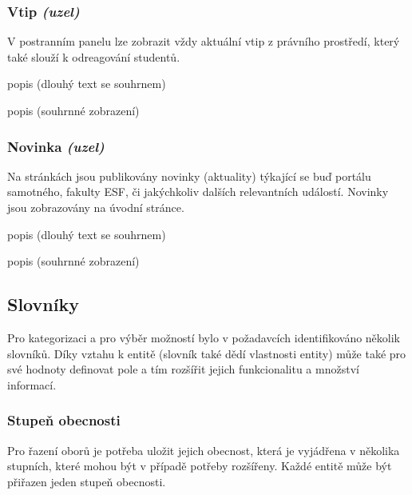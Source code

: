 \subsubsection*{Vtip \emph{(uzel)}}
V postranním panelu lze zobrazit vždy aktuální vtip z právního prostředí, který také slouží k odreagování studentů. \\

\begin{list}{-}{Pole}
  \item popis (dlouhý text se souhrnem)
\end{list}

\begin{list}{-}{Zobrazení}
  \item popis (souhrnné zobrazení)
\end{list}


\subsubsection*{Novinka \emph{(uzel)}}
Na stránkách jsou publikovány novinky (aktuality) týkající se buď portálu samotného, fakulty ESF, či jakýchkoliv dalších relevantních událostí. Novinky jsou zobrazovány na úvodní stránce. \\

\begin{list}{-}{Pole}
  \item popis (dlouhý text se souhrnem)
\end{list}

\begin{list}{-}{Zobrazení}
  \item popis (souhrnné zobrazení)
\end{list}


\subsection{Slovníky}

Pro kategorizaci a pro výběr možností bylo v požadavcích identifikováno několik slovníků. Díky vztahu k entitě (slovník také dědí vlastnosti entity) může také pro své hodnoty definovat pole a tím rozšířit jejich funkcionalitu a množství informací.

\subsubsection*{Stupeň obecnosti}
Pro řazení oborů je potřeba uložit jejich obecnost, která je vyjádřena v několika stupních, které mohou být v případě potřeby rozšířeny. Každé entitě může být přiřazen jeden stupeň obecnosti.\\

